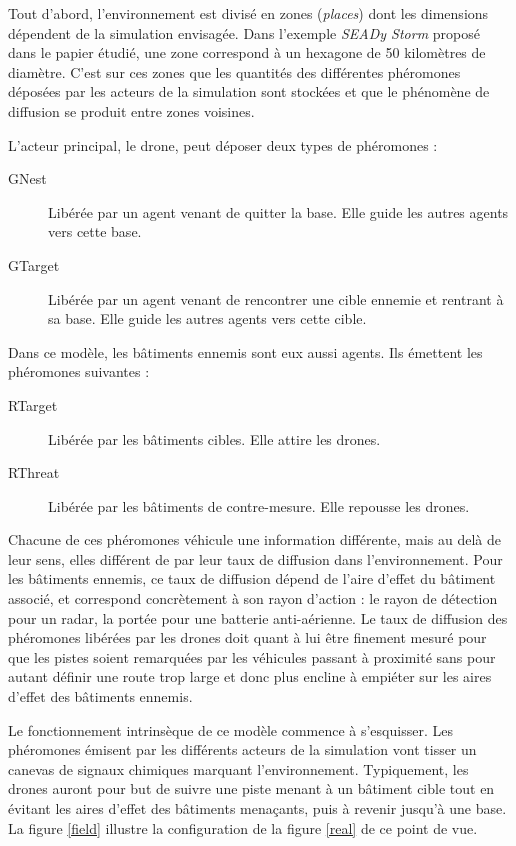 \documentclass[12pt]{article}
\begin{document}
Tout d'abord, l'environnement est divisé en zones (\textit{places})
dont les dimensions dépendent de la simulation envisagée.  Dans
l'exemple \textit{SEADy Storm} proposé dans le papier étudié, une zone
correspond à un hexagone de 50 kilomètres de diamètre. C'est sur ces
zones que les quantités des différentes phéromones déposées par les
acteurs de la simulation sont stockées et que le phénomène de
diffusion se produit entre zones voisines.

L'acteur principal, le drone, peut déposer deux types de phéromones :

\begin{description}
\item[GNest]{Libérée par un agent venant de quitter la base. Elle
  guide les autres agents vers cette base.}
\item[GTarget]{Libérée par un agent venant de rencontrer une cible
  ennemie et rentrant à sa base. Elle guide les autres agents vers
  cette cible.}
\end{description}

Dans ce modèle, les bâtiments ennemis sont eux aussi agents. Ils
émettent les phéromones suivantes :

\begin{description}
\item[RTarget]{Libérée par les bâtiments cibles. Elle attire les
  drones.}
\item[RThreat]{Libérée par les bâtiments de contre-mesure. Elle
  repousse les drones.}
\end{description}

Chacune de ces phéromones véhicule une information différente, mais au
delà de leur sens, elles différent de par leur taux de diffusion dans
l'environnement.  Pour les bâtiments ennemis, ce taux de diffusion
dépend de l'aire d'effet du bâtiment associé, et correspond
concrètement à son rayon d'action : le rayon de détection pour un
radar, la portée pour une batterie anti-aérienne.  Le taux de
diffusion des phéromones libérées par les drones doit quant à lui être
finement mesuré pour que les pistes soient remarquées par les
véhicules passant à proximité sans pour autant définir une route trop
large et donc plus encline à empiéter sur les aires d'effet des
bâtiments ennemis.

Le fonctionnement intrinsèque de ce modèle commence à s'esquisser. Les
phéromones émisent par les différents acteurs de la simulation vont
tisser un canevas de signaux chimiques marquant l'environnement.
Typiquement, les drones auront pour but de suivre une piste menant à
un bâtiment cible tout en évitant les aires d'effet des bâtiments
menaçants, puis à revenir jusqu'à une base. La figure \ref{field}
illustre la configuration de la figure \ref{real} de ce point de vue.
\end{document}
